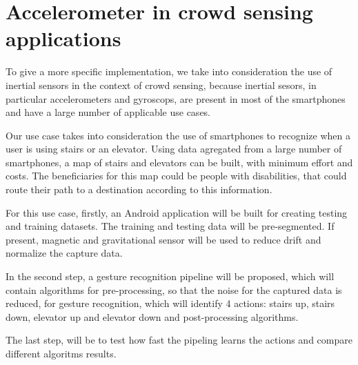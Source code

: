 \section{Accelerometer in crowd sensing applications}
\label{sec:intro-acc-crowd}

To give a more specific implementation, we take into consideration the use of inertial sensors in the context of crowd sensing, because inertial sesors, in particular accelerometers and gyroscops, are present in most of the smartphones and have a large number of applicable use cases.

Our use case takes into consideration the use of smartphones to recognize when a user is using stairs or an elevator. Using data agregated from a large number of smartphones, a map of stairs and elevators can be built, with minimum effort and costs. The beneficiaries for this map could be people with disabilities, that could route their path to a destination according to this information.

For this use case, firstly, an Android application will be built for creating testing and training datasets. The training and testing data will be pre-segmented. If present, magnetic and gravitational sensor will be used to reduce drift and normalize the capture data.

In the second step, a gesture recognition pipeline will be proposed, which will contain algorithms for pre-processing, so that the noise for the captured data is reduced, for gesture recognition, which will identify 4 actions: stairs up, stairs down, elevator up and elevator down and post-processing algorithms.

The last step, will be to test how fast the pipeling learns the actions and compare different algoritms results.
